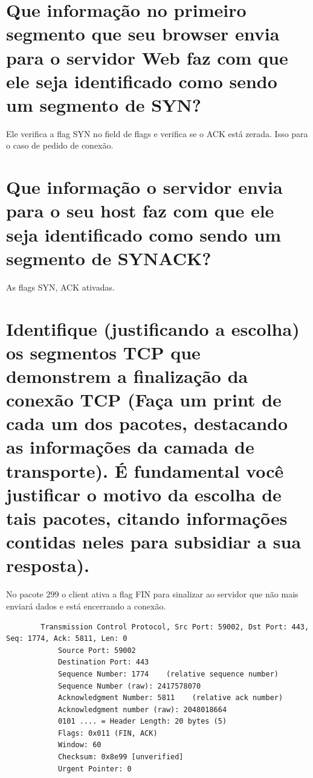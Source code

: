
\begin{parts}
    \part{Que informação no primeiro segmento que seu browser envia para o servidor Web faz com que ele seja identificado como sendo um segmento de SYN?}
    \begin{solution}
        Ele verifica a flag SYN no field de flags e verifica se o ACK está zerada. Isso para o caso de pedido de conexão.
    \end{solution}

    \part{Que informação o servidor envia para o seu host faz com que ele seja identificado como sendo um segmento de SYNACK?}
    \begin{solution}
        As flags SYN, ACK ativadas.
    \end{solution}

    \part{Identifique (justificando a escolha) os segmentos TCP que demonstrem a finalização da conexão TCP (Faça um print de cada um dos pacotes, destacando as informações da camada de transporte). É fundamental você justificar o motivo da escolha de tais pacotes, citando informações contidas neles para subsidiar a sua resposta).}
    \begin{solution}
        No pacote $299$ o client ativa a flag FIN para sinalizar ao servidor que não mais enviará dados e está encerrando a  conexão.
        \begin{verbatim}
        Transmission Control Protocol, Src Port: 59002, Dst Port: 443, Seq: 1774, Ack: 5811, Len: 0
            Source Port: 59002
            Destination Port: 443
            Sequence Number: 1774    (relative sequence number)
            Sequence Number (raw): 2417578070
            Acknowledgment Number: 5811    (relative ack number)
            Acknowledgment number (raw): 2048018664
            0101 .... = Header Length: 20 bytes (5)
            Flags: 0x011 (FIN, ACK)
            Window: 60
            Checksum: 0x8e99 [unverified]
            Urgent Pointer: 0
        \end{verbatim}    


\end{solution}
\end{parts}
